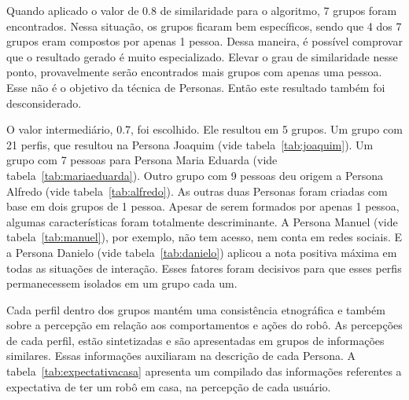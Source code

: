 Quando aplicado o valor de 0.8 de similaridade para o algoritmo, 7 grupos foram encontrados. Nessa situação, os grupos ficaram bem específicos, sendo que 4 dos 7 grupos eram compostos por apenas 1 pessoa. Dessa maneira, é possível comprovar que o resultado gerado é muito especializado. Elevar o grau de similaridade nesse ponto, provavelmente serão encontrados mais grupos com apenas uma pessoa. Esse não é o objetivo da técnica de Personas. Então este resultado também foi desconsiderado.

O valor intermediário, 0.7, foi escolhido. Ele resultou em 5 grupos. Um grupo com 21 perfis, que resultou na Persona Joaquim (vide tabela~\ref{tab:joaquim}). Um grupo com 7 pessoas para Persona Maria Eduarda (vide tabela~\ref{tab:mariaeduarda}). Outro grupo com 9 pessoas deu origem a Persona Alfredo (vide tabela~\ref{tab:alfredo}). As outras duas Personas foram criadas com base em dois grupos de 1 pessoa. Apesar de serem formados por apenas 1 pessoa, algumas características foram totalmente descriminante. A Persona Manuel (vide tabela~\ref{tab:manuel}), por exemplo, não tem acesso, nem conta em redes sociais. E a Persona Danielo (vide tabela~\ref{tab:danielo}) aplicou a nota positiva máxima em todas as situações de interação. Esses fatores foram decisivos para que esses perfis permanecessem isolados em um grupo cada um.

Cada perfil dentro dos grupos mantém uma consistência etnográfica e também sobre a percepção em relação aos comportamentos e ações do robô. As percepções de cada perfil, estão sintetizadas e são apresentadas em grupos de informações similares. Essas informações auxiliaram na descrição de cada Persona. A tabela~\ref{tab:expectativacasa} apresenta um compilado das informações referentes a expectativa de ter um robô em casa, na percepção de cada usuário.

